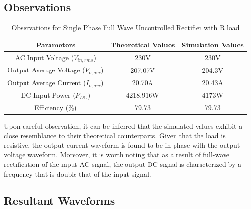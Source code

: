 \subsection{Observations}

\begin{table}[h]
    \renewcommand{\arraystretch}{1.3}
    \label{table_observation_circuit_1}
    \centering
    \begin{tabular}{|c|c|c|}
        \hline
        Parameters                              & Theoretical Values & Simulation Values \\
        \hline
        \hline
        AC Input Voltage ($ V_{in,rms} $)       & 230V               & 230V              \\
        \hline
        Output Average Voltage ($ V_{o,avg} $)  & 207.07V            & 204.3V            \\
        \hline
        Output Average Current ($ I_{o,avg}  $) & 20.70A             & 20.43A            \\
        \hline
        DC Input Power ($ P_{DC}  $)            & 4218.916W          & 4173W             \\
        \hline
        Efficiency (\%)                         & 79.73              & 79.73             \\
        \hline
    \end{tabular}
    \caption{Observations for Single Phase Full Wave Uncontrolled Rectifier with R load}

\end{table}


Upon careful observation, it can be inferred that the simulated values exhibit a close resemblance to their theoretical counterparts. Given that the load is resistive, the output current waveform is found to be in phase with the output voltage waveform. Moreover, it is worth noting that as a result of full-wave rectification of the input AC signal, the output DC signal is characterized by a frequency that is double that of the input signal.
\pagebreak

\subsection{Resultant Waveforms}

